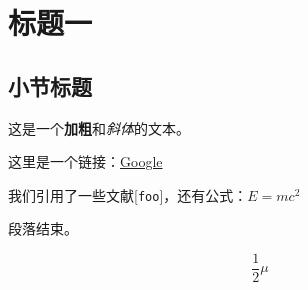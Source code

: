 \chapter{标题一}
\section{小节标题}
这是一个\textbf{加粗}和\textit{斜体}的文本。

这里是一个链接：\href{https://www.google.com}{Google}

我们引用了一些文献[\texttt{foo}]，还有公式：$E = mc^2$

段落结束。

\begin{equation}
\frac{1}{2}\mu
\label{eq:hhhhh}
\end{equation}

